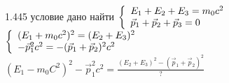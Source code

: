 \testCom
{%
	1.445
}
{%
	условие
}
{%
	дано
}
{%
	найти
}
{%
	$\left\{\begin{array}{l l}
			E_1 + E_2 + E_3 = m_0 c^2\\
			\vec p_1 + \vec p_2 + \vec p_3 = 0
			\end{array}\right.$\\
	$\left\{\begin{array}{l l}
			(E_1 + m_0 c^2)^2=(E_2 + E_3)^2\\
			- \vec p_1^2 c^2 = - (\vec p_1 + \vec p_2)^2 c^2
			\end{array}\right.$\\
	$(E_1 - m_0 C^2)^2 - \vec p_1^2 c^2 = \frac{(E_2 + E_3)^2 - (\vec p_1 + \vec p_2)^2}{?}$\\
}

